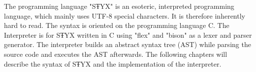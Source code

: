The programming language "SŦYX" is an esoteric, interpreted programming language,
which mainly uses UTF-8 special characters. It is therefore inherently hard to read.
The syntax is oriented on the programming
language C.  The Interpreter is for SŦYX written in C using "flex"
and "bison" as a lexer and parser generator.
The interpreter builds an abstract syntax tree (AST) while parsing the source code and
executes the AST afterwards. The following chapters will describe the syntax of SŦYX
and the implementation of the interpreter.

